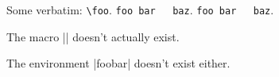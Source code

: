 \documentclass{nlctdoc}
\begin{document}
Some verbatim: \verb"\foo". \verb*"foo bar   baz".
\verb"foo bar   baz".

\DescribeMacro{\foo}The macro |\foo| doesn't actually exist.

The environment |foobar| doesn't exist either.

\PrintIndex
\end{document}
